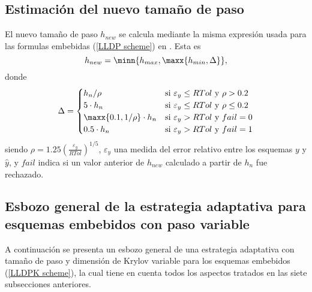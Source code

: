 \subsection{Estimaci\'on del nuevo tama\~no de paso}
El nuevo tama\~no de paso $h_{new}$ se calcula mediante la misma expresión usada para las formulas embebidas (\ref{LLDP scheme}) en \cite{Jimenez14AMC}. Esta es
\begin{equation}
	h_{new} = \minn{h_{max},\maxx{h_{min},\Delta}}, \label{hnewcalc}
\end{equation}
donde 
\[ \Delta = \begin{cases}
h_n/\rho & \text{si } \varepsilon_y\leq RTol \text{ y } \rho>0\mathord{.}2\\
5\cdot h_n & \text{si } \varepsilon_y\leq RTol \text{ y } \rho\leq 0\mathord{.}2\\
\maxx{0\mathord{.}1,1/\rho}\cdot h_n & \text{si } \varepsilon_y > RTol \text{ y } fail=0\\
0\mathord{.}5\cdot h_n & \text{si } \varepsilon_y > RTol \text{ y } fail=1
\end{cases} \]
siendo $\rho = 1\mathord{.}25 \left( \frac{\varepsilon_y}{RTol} \right)^{1/5}$, $\varepsilon_y$ una medida del error relativo entre los esquemas $y$ y $\hat y$, y $fail$ indica si un valor anterior de $h_{new}$ calculado a partir de $h_n$ fue rechazado.   

\subsection{Esbozo general de la estrategia adaptativa para esquemas embebidos con paso variable}\label{adaptstrat}

A continuación se presenta un esbozo general de una estrategia adaptativa con tamaño de paso y dimensión de Krylov variable para los esquemas embebidos (\ref{LLDPK scheme}), la cual tiene en cuenta todos los aspectos tratados en las siete subsecciones anteriores.   

